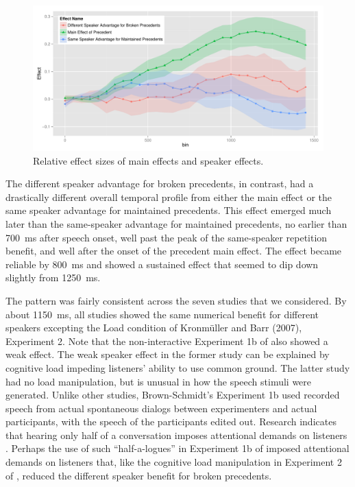 \documentclass[doc,fignum,apacite,floatsintext]{apa6}
\begin{document}
\begin{figure}
\caption{Relative effect sizes of main effects and speaker effects.}
\label{fig:effsize}
\centerline{\includegraphics[width=6in]{releff.pdf}}
\end{figure}

The different speaker advantage for broken precedents, in contrast, had a drastically different overall temporal profile from either the main effect or the same speaker advantage for maintained precedents.  This effect emerged much later than the same-speaker advantage for maintained precedents, no earlier than 700~ms after speech onset, well past the peak of the same-speaker repetition benefit, and well after the onset of the precedent main effect.  The effect became reliable by 800~ms and showed a sustained effect that seemed to dip down slightly from 1250~ms.

The pattern was fairly consistent across the seven studies that we considered.  By about 1150~ms, all studies showed the same numerical benefit for different speakers excepting the Load condition of Kronm\"{u}ller and Barr (2007), Experiment 2.  Note that the non-interactive Experiment 1b of  also showed a weak effect.  The weak speaker effect in the former study can be explained by cognitive load impeding listeners' ability to use common ground.  The latter study had no load manipulation, but is unusual in how the speech stimuli were generated.  Unlike other studies, Brown-Schmidt's Experiment 1b used recorded speech from actual spontaneous dialogs between experimenters and actual participants, with the speech of the participants edited out.  Research indicates that hearing only half of a conversation imposes attentional demands on listeners \cite{EmbersonEtAl2010}.  Perhaps the use of such ``half-a-logues'' in Experiment 1b of  imposed attentional demands on listeners that, like the cognitive load manipulation in Experiment 2 of , reduced the different speaker benefit for broken precedents.
\end{document}
